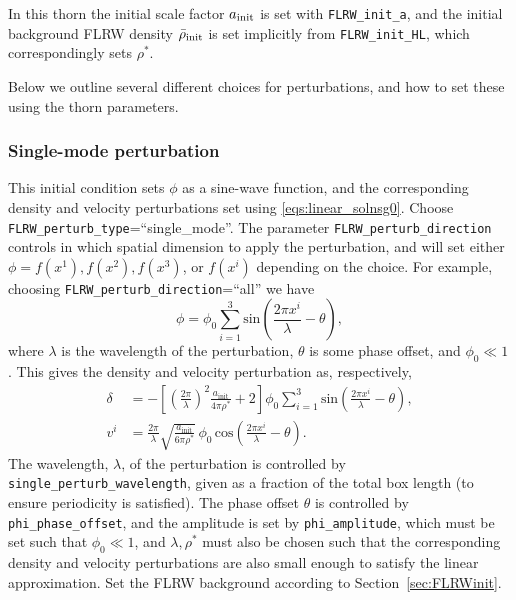In this thorn the initial scale factor $a_{\rm init}$ is set with \texttt{FLRW\_init\_a}, and the initial background FLRW density $\bar{\rho}_{\rm init}$ is set implicitly from \texttt{FLRW\_init\_HL}, which correspondingly sets $\rho^*$.

Below we outline several different choices for perturbations, and how to set these using the thorn parameters.

\subsubsection{Single-mode perturbation}

This initial condition sets $\phi$ as a sine-wave function, and the corresponding density and velocity perturbations set using \eqref{eqs:linear_solnsg0}. Choose \texttt{FLRW\_perturb\_type}=``single\_mode''. The parameter \texttt{FLRW\_perturb\_direction} controls in which spatial dimension to apply the perturbation, and will set either $\phi=f(x^1),f(x^2),f(x^3)$, or $f(x^i)$ depending on the choice. For example, choosing \texttt{FLRW\_perturb\_direction}=``all'' we have
\begin{equation}\label{eq:phi}
	\phi = \phi_{0} \sum_{i=1}^{3} \mathrm{sin}\left(\frac{2\pi x^{i}}{\lambda} - \theta \right),
\end{equation}
where $\lambda$ is the wavelength of the perturbation, $\theta$ is some phase offset, and $\phi_0\ll1$. This gives the density and velocity perturbation as, respectively, \cite{macpherson2017}
\begin{align} 
	\delta &= - \left[ \left(\frac{2\pi}{\lambda}\right)^{2} \frac{a_{\mathrm{init}}}{4\pi\rho^{*}} + 2\right] \phi_{0} \sum_{i=1}^{3} \mathrm{sin}\left(\frac{2\pi x^{i}}{\lambda} - \theta \right),\label{eq:initial_delta}\\
	v^{i} &= \frac{2\pi}{\lambda}\sqrt{\frac{a_{\mathrm{init}}}{6\pi\rho^{*}}}\, \phi_{0}\, \mathrm{cos}\left(\frac{2\pi x^{i}}{\lambda} - \theta \right). \label{eq:initial_deltav}
\end{align}
The wavelength, $\lambda$, of the perturbation is controlled by \texttt{single\_perturb\_wavelength}, given as a fraction of the total box length (to ensure periodicity is satisfied). The phase offset $\theta$ is controlled by {\tt phi\_phase\_offset}, and the amplitude is set by \texttt{phi\_amplitude}, which must be set such that $\phi_0\ll1$, and $\lambda, \rho^*$ must also be chosen such that the corresponding density and velocity perturbations are also small enough to satisfy the linear approximation. Set the FLRW background according to Section~\ref{sec:FLRWinit}.


